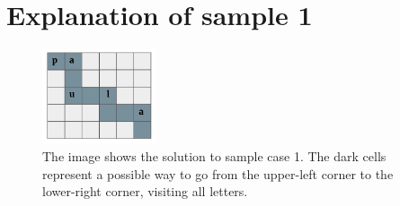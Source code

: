 \section*{Explanation of sample 1}

\begin{figure}[h]
    \centering
    \includegraphics[width=0.3\textwidth]{sample.PNG}
      \\The image shows the solution to sample case 1. The dark cells 
      represent a possible way to go from the upper-left corner to the 
      lower-right corner, visiting all letters.
    
  \end{figure}
